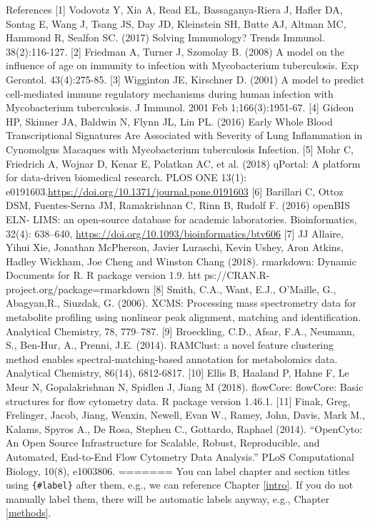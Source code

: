 \documentclass[]{book}
\begin{document}
References {[}1{]} Vodovotz Y, Xia A, Read EL, Bassaganya-Riera J,
Hafler DA, Sontag E, Wang J, Tsang JS, Day JD, Kleinstein SH, Butte AJ,
Altman MC, Hammond R, Sealfon SC. (2017) Solving Immunology? Trends
Immunol. 38(2):116-127. {[}2{]} Friedman A, Turner J, Szomolay B. (2008)
A model on the influence of age on immunity to infection with
Mycobacterium tuberculosis. Exp Gerontol. 43(4):275-85. {[}3{]}
Wigginton JE, Kirschner D. (2001) A model to predict cell-mediated
immune regulatory mechanisms during human infection with Mycobacterium
tuberculosis. J Immunol. 2001 Feb 1;166(3):1951-67. {[}4{]} Gideon HP,
Skinner JA, Baldwin N, Flynn JL, Lin PL. (2016) Early Whole Blood
Transcriptional Signatures Are Associated with Severity of Lung
Inflammation in Cynomolgus Macaques with Mycobacterium tuberculosis
Infection. {[}5{]} Mohr C, Friedrich A, Wojnar D, Kenar E, Polatkan AC,
et al. (2018) qPortal: A platform for data-driven biomedical research.
PLOS ONE 13(1):
e0191603.\url{https://doi.org/10.1371/journal.pone.0191603} {[}6{]}
Barillari C, Ottoz DSM, Fuentes-Serna JM, Ramakrishnan C, Rinn B, Rudolf
F. (2016) openBIS ELN- LIMS: an open-source database for academic
laboratories. Bioinformatics, 32(4): 638--640,
\url{https://doi.org/10.1093/bioinformatics/btv606} {[}7{]} JJ Allaire,
Yihui Xie, Jonathan McPherson, Javier Luraschi, Kevin Ushey, Aron
Atkins, Hadley Wickham, Joe Cheng and Winston Chang (2018). rmarkdown:
Dynamic Documents for R. R package version 1.9. htt
ps://CRAN.R-project.org/package=rmarkdown {[}8{]} Smith, C.A., Want,
E.J., O'Maille, G., Abagyan,R., Siuzdak, G. (2006). XCMS: Processing
mass spectrometry data for metabolite profiling using nonlinear peak
alignment, matching and identification. Analytical Chemistry, 78,
779--787. {[}9{]} Broeckling, C.D., Afsar, F.A., Neumann, S., Ben-Hur,
A., Prenni, J.E. (2014). RAMClust: a novel feature clustering method
enables spectral-matching-based annotation for metabolomics data.
Analytical Chemistry, 86(14), 6812-6817. {[}10{]} Ellis B, Haaland P,
Hahne F, Le Meur N, Gopalakrishnan N, Spidlen J, Jiang M (2018).
flowCore: flowCore: Basic structures for flow cytometry data. R package
version 1.46.1. {[}11{]} Finak, Greg, Frelinger, Jacob, Jiang, Wenxin,
Newell, Evan W., Ramey, John, Davis, Mark M., Kalams, Spyros A., De
Rosa, Stephen C., Gottardo, Raphael (2014). ``OpenCyto: An Open Source
Infrastructure for Scalable, Robust, Reproducible, and Automated,
End-to-End Flow Cytometry Data Analysis.'' PLoS Computational Biology,
10(8), e1003806.
=======
You can label chapter and section titles using \texttt{\{\#label\}}
after them, e.g., we can reference Chapter \ref{intro}. If you do not
manually label them, there will be automatic labels anyway, e.g.,
Chapter \ref{methods}.
\end{document}
